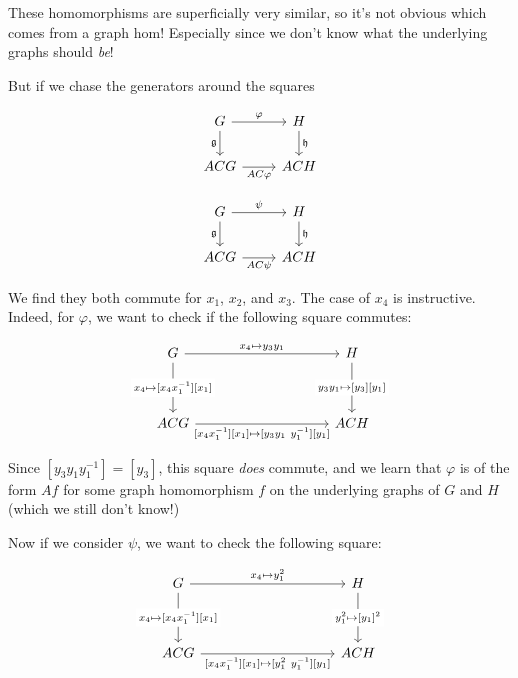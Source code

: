 \documentclass[12pt]{article}
\theoremstyle{definition}
\theoremstyle{theorem}
\begin{document}
These homomorphisms are superficially very similar, so it's not obvious 
which comes from a graph hom! Especially since we don't know what the 
underlying graphs should \emph{be}!

But if we chase the generators around the squares 

\noindent\begin{minipage}{.5\linewidth}
  \[\begin{tikzcd}
	G & H \\
	ACG & ACH
	\arrow["\varphi", from=1-1, to=1-2]
	\arrow["{\mathfrak{g}}"', from=1-1, to=2-1]
	\arrow["{\mathfrak{h}}", from=1-2, to=2-2]
	\arrow["AC\varphi"', from=2-1, to=2-2]
\end{tikzcd}\]
\end{minipage}%
\begin{minipage}{.5\linewidth}
  \[\begin{tikzcd}
	G & H \\
	ACG & ACH
	\arrow["\psi", from=1-1, to=1-2]
	\arrow["{\mathfrak{g}}"', from=1-1, to=2-1]
	\arrow["{\mathfrak{h}}", from=1-2, to=2-2]
	\arrow["AC\psi"', from=2-1, to=2-2]
\end{tikzcd}\]
\end{minipage}

We find they both commute for $x_1$, $x_2$, and $x_3$. The case of 
$x_4$ is instructive. Indeed, for $\varphi$, we want to check if the 
following square commutes:

\[\begin{tikzcd}
	G &&&& H \\
	\\
	ACG &&&& ACH
	\arrow["{x_4 \mapsto y_3 y_1}", from=1-1, to=1-5]
	\arrow["{x_4 \mapsto [x_4 x_1^{-1}][x_1]}"{description}, from=1-1, to=3-1]
	\arrow["{y_3 y_1 \mapsto [y_3][y_1]}"{description}, from=1-5, to=3-5]
	\arrow["{[x_4 x_1^{-1}][x_1] \mapsto [y_3 y_1 \ y_1^{-1}][y_1]}"', from=3-1, to=3-5]
\end{tikzcd}\]

Since $[y_3 y_1 y_1^{-1}] = [y_3]$, this square \emph{does} 
commute, and we learn that $\varphi$ is of the form $A f$ for some 
graph homomorphism $f$ on the underlying graphs of $G$ and $H$ 
(which we still don't know!)

Now if we consider $\psi$, we want to check the following square:

\[\begin{tikzcd}
	G &&&& H \\
	\\
	ACG &&&& ACH
	\arrow["{x_4 \mapsto y_1^2}", from=1-1, to=1-5]
	\arrow["{x_4 \mapsto [x_4 x_1^{-1}][x_1]}"{description}, from=1-1, to=3-1]
	\arrow["{y_1^2 \mapsto [y_1]^2}"{description}, from=1-5, to=3-5]
	\arrow["{[x_4 x_1^{-1}][x_1] \mapsto [y_1^2 \ y_1^{-1}][y_1]}"', from=3-1, to=3-5]
\end{tikzcd}\]
\end{document}
